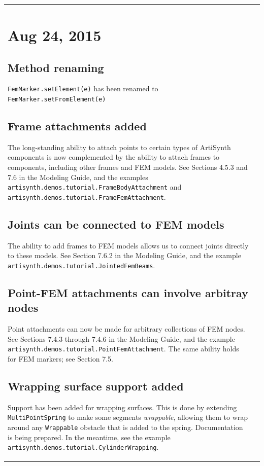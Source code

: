 \documentclass{article}
\begin{document}
\begin{tabular}{ll}
\section*{Aug 24, 2015}

\subsection*{Method renaming}

{\tt FemMarker.setElement(e)} has been renamed to {\tt
FemMarker.setFromElement(e)}

\subsection*{Frame attachments added}

The long-standing ability to attach points to certain types of
ArtiSynth components is now complemented by the ability to attach
frames to components, including other frames and FEM models. See
Sections 4.5.3 and 7.6 in the Modeling Guide, and the examples {\tt
artisynth.demos.tutorial.FrameBodyAttachment} and {\tt
artisynth.demos.tutorial.FrameFemAttachment}.

\subsection*{Joints can be connected to FEM models}

The ability to add frames to FEM models allows us to connect joints
directly to these models. See Section 7.6.2 in the Modeling Guide,
and the example {\tt artisynth.demos.tutorial.JointedFemBeams}.

\subsection{Point-FEM attachments can involve arbitray nodes}

Point attachments can now be made for arbitrary collections of FEM nodes.
See Sections 7.4.3 through 7.4.6 in the Modeling Guide, and the
example {\tt artisynth.demos.tutorial.PointFemAttachment}.  The same
ability holds for FEM markers; see Section 7.5.

\subsection{Wrapping surface support added}

Support has been added for wrapping surfaces. This is done by
extending {\tt MultiPointSpring} to make some segments {\it
wrappable}, allowing them to wrap around any {\tt Wrappable} obstacle
that is added to the spring. Documentation is being prepared. In the
meantime, see the example {\tt
artisynth.demos.tutorial.CylinderWrapping}.


\end{tabular}
\end{document}
